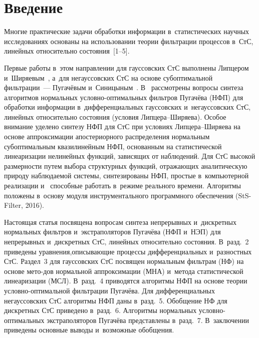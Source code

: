 
\vspace*{-6pt}


\thispagestyle{headings}

\begin{multicols}{2}

\label{st\stat}

\section{Введение}

Многие практические задачи обработки информации в~статистических научных 
исследованиях основаны на использовании теории фильтрации процессов в~СтС, 
линейных относительно состояния~[1--5]. 

Первые работы в~этом 
направлении для гауссовских СтС выполнены Липцером и~Ширяевым~\cite{2-s2}, 
а~для негауссовских СтС на основе субоптимальной фильтрации~--- 
Пугачёвым и~Синицыным~\cite{3-s2, 4-s2}.
В~\cite{1-s2} рассмотрены вопросы синтеза алгоритмов нормальных 
услов\-но-оп\-ти\-маль\-ных 
фильтров  Пугачёва (НФП) для обработки информации в~дифференциальных 
гауссовских и~негауссовских СтС, линейных относительно состояния 
(условия Лип\-це\-ра--Ши\-ря\-ева). Особое внимание уделено синтезу НФП для СтС 
при условиях Лип\-це\-ра--Ши\-ря\-ева
 на основе аппроксимации апостериорного распределения нормальным субоптимальным 
 квазилинейным НФП, основанным на статистической линеаризации нелинейных функций, 
 зависящих от наблюдений. Для СтС высокой размерности  путем выбора структурных 
 функций, отражающих аналитическую природу наблюдаемой системы, синтезированы НФП, 
 прос\-тые в~компьютерной реализации и~ способные работать в~режиме реального времени. 
 Алгоритмы положены 
 в~основу модуля инструментального программного обеспечения (StS-Filter, 2016).

Настоящая статья  посвящена вопросам синтеза непрерывных и~дискретных нормальных 
фильтров и~экстраполяторов Пугачёва (НФП и~НЭП) для непрерывных и~дискретных СтС, 
линейных относительно состояния. 
В~разд.~2 приведены уравнения,\linebreak описывающие 
процессы дифференциальных и~разностных СтС. Раздел~3 для гауссовских СтС посвящен 
нормальным фильтрам (НФ) на основе мето-\linebreak дов нормальной 
аппроксимации (МНА) и~метода\linebreak 
статистической линеаризации (МСЛ). В~разд.~4 приводятся алгоритмы НФП на основе 
тео\-рии услов\-но-оп\-ти\-маль\-ной фильтрации Пугачёва. Для дифференциальных 
негауссовских СтС алгоритмы НФП даны в~разд.~5. Обобщение НФ для дискретных СтС 
приведено в~разд.~6. Алгоритмы нормальных услов\-но-оп\-ти\-маль\-ных 
экстраполяторов Пугачёва представлены в~разд.~7. В~заключении приведены основные 
выводы и~возможные обобщения.


\end{multicols}
